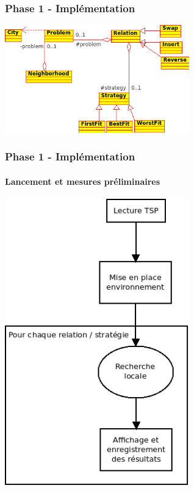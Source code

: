 \documentclass{beamer}
\begin{document}
\begin{frame}
  \frametitle{Phase 1 - Implémentation}
  
  \begin{center}
    \includegraphics[width=0.6\textwidth,height=0.6\textheight]{../UML/crs.png}
  \end{center}
  
\end{frame}


\begin{frame}
  \frametitle{Phase 1 - Implémentation}
  \framesubtitle{Lancement et mesures préliminaires}
  
  \begin{center}
  \includegraphics[width=0.6\textwidth,height=0.75\textheight]{images/exec-phase-1.png}
  \end{center}
  
\end{frame}
\end{document}
